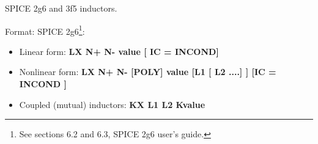 %
%
%
%

\renewcommand{\thesubfigure}{\thefigure(\alph{subfigure})}
\makeatletter
  \renewcommand{\@thesubfigure}{\thesubfigure:\space}
  \renewcommand{\p@subfigure}{}
\makeatother

\renewcommand{\thesubtable}{\thetable(\alph{subtable})}
\makeatletter
  \renewcommand{\@thesubtable}{\thesubtable:\space}
  \renewcommand{\p@subtable}{}
\makeatother
{}
SPICE 2g6 and 3f5 inductors.


\begin{flushleft}
Format: SPICE 2g6\footnote{See sections 6.2 and 6.3, SPICE 2g6 user's guide.}: \hspace*{5mm}

\begin{itemize}
 \item Linear form: \textbf{LX N+ N- value [ IC = INCOND]}
 \item Nonlinear form: \textbf{LX N+ N- [POLY] value [L1 [ L2 ....] ] [IC = INCOND ]   }
 \item Coupled (mutual) inductors: \textbf{KX L1 L2 Kvalue}
\end{itemize}

 \end{flushleft}

